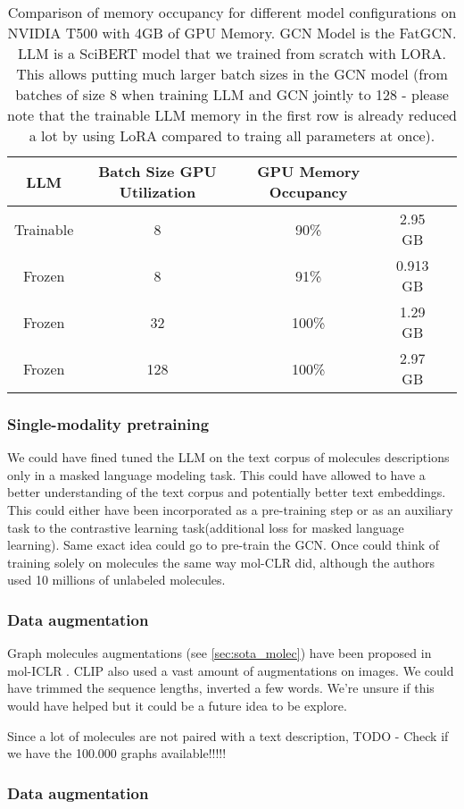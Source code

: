 \begin{table*}[H]
    \centering
    \begin{tabular}{ccccc}
    \hline
    \textbf{LLM} & \textbf{Batch Size} \textbf{GPU Utilization}& \textbf{GPU Memory Occupancy} \\ \hline
    Trainable & 8 & 90\% & 2.95 GB \\
    Frozen & 8 & 91\% & 0.913 GB \\
    Frozen & 32 & 100\% & 1.29 GB \\
    Frozen & 128 & 100\% & 2.97 GB \\
    \hline
    \end{tabular}
    \caption{Comparison of memory occupancy for different model configurations on NVIDIA T500 with 4GB of GPU Memory. GCN Model is the FatGCN. LLM is a SciBERT model that we trained from scratch with LORA. This allows putting much larger batch sizes in the GCN model (from batches of size 8 when training LLM and GCN jointly to 128 - please note that the trainable LLM memory in the first row is already reduced a lot by using LoRA compared to traing all parameters at once).}
    \label{table:ft_gcn_model_memory_occupancy}
\end{table*}

\subsubsection*{Single-modality pretraining}
We could have fined tuned the LLM on the text corpus of molecules descriptions only in a masked language modeling task. This could have allowed to have a better understanding of the text corpus and potentially better text embeddings. This could either have been incorporated as a pre-training step or as an auxiliary task to the contrastive learning task(additional loss for masked language learning).
Same exact idea could go to pre-train the GCN. Once could think of training solely on molecules the same way mol-CLR \cite{molCLR} did, although the authors used 10 millions of unlabeled molecules.

\subsubsection*{Data augmentation}
Graph molecules augmentations (see \ref{sec:sota_molec}) have been proposed in mol-ICLR \cite{molCLR} . CLIP \cite{CLIP} also used a vast amount of augmentations on images. We could have trimmed the sequence lengths, inverted a few words. We're unsure if this would have helped but it could be a future idea to be explore.

Since a lot of molecules are not paired with a text description, 
\color{red}TODO - Check if we have the 100.000 graphs available!!!!!\color{black}


\subsubsection*{Data augmentation}